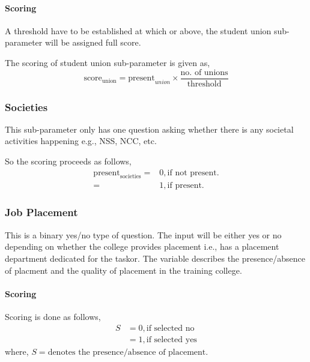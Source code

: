 \documentclass[oneside,twocolumn]{article}
\begin{document}
\paragraph{Scoring}
A threshold have to be established at which or above,
the student union sub-parameter will be assigned full
score.

The scoring of student union sub-parameter is given as,
\[
\text{score}_{\text{union}} = \text{present}_{union} \times 
\dfrac{\text{no. of unions}}{\text{threshold}}
\]

\subsubsection{Societies}
This sub-parameter only has one question asking whether
there is any societal activities happening e.g., NSS, NCC, etc.

So the scoring proceeds as follows,
\begin{align*}
  \text{present}_{\text{societies}} =& 0, \text{if not present.} \\
  =& 1, \text{if present.}
\end{align*}

\subsubsection{Job Placement}
This is a binary yes/no type of question. The input will be
either yes or no depending on whether the college provides
placement i.e., has a placement department dedicated for the
taskor. The variable describes the presence/absence of
placment and the quality of placement in the training college.
\paragraph{Scoring}
Scoring is done as follows,
\begin{align*}
	S &= 0, \text{if selected no} \\
     	  &= 1, \text{if selected yes}
\end{align*}
where, \(S = \text{denotes the presence/absence of placement}\).
\end{document}
